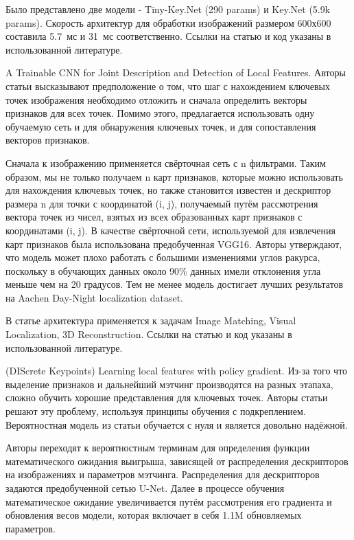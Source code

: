 \documentclass[a4paper]{article}
\begin{document}
 Было представлено две модели - Tiny-Key.Net (290 params) и Key.Net (5.9k params). Скорость архитектур для обработки изображений размером 600х600 составила 5.7~мс и 31~мс соответственно. Ссылки на статью и код указаны в использованной литературе.
 

 A Trainable CNN for Joint Description and Detection of Local Features. Авторы статьи высказывают предположение о том, что шаг с нахождением ключевых точек изображения необходимо отложить и сначала определить векторы признаков для всех точек. Помимо этого, предлагается использовать одну обучаемую сеть и для обнаружения ключевых точек, и для сопоставления векторов признаков.




Сначала к изображению применяется свёрточная сеть с n фильтрами. Таким образом, мы не только получаем n карт признаков, которые можно использовать для нахождения ключевых точек, но также становится известен и дескриптор размера n для точки с координатой (i, j), получаемый путём рассмотрения вектора точек из чисел, взятых из всех образованных карт признаков с координатами (i, j). В качестве свёрточной сети, используемой для извлечения карт признаков была использована предобученная VGG16. Авторы утверждают, что модель может плохо работать с большими изменениями углов ракурса, поскольку в обучающих данных около 90\% данных имели отклонения угла меньше чем на 20 градусов. Тем не менее модель достигает лучших результатов на Aachen Day-Night localization dataset.


В статье архитектура применяется к задачам Image Matching, Visual Localization, 3D Reconstruction. Ссылки на статью и код указаны в использованной литературе. 


 (DIScrete Keypoints) Learning local features with policy gradient. Из-за того что выделение признаков и дальнейший мэтчинг производятся на разных этапаха, сложно обучить хорошие представления для ключевых точек. Авторы статьи решают эту проблему, используя принципы обучения с подкреплением. Вероятностная модель из статьи обучается с нуля и является довольно надёжной.


Авторы переходят к вероятностным терминам для определения функции математического ожидания выигрыша, зависящей от распределения дескрипторов на изображениях и параметров мэтчинга. Распределения для дескрипторов задаются предобученной сетью U-Net. Далее в процессе обучения математическое ожидание увеличивается путём рассмотрения его градиента и обновления весов модели, которая включает в себя 1.1M обновляемых параметров.
\end{document}
